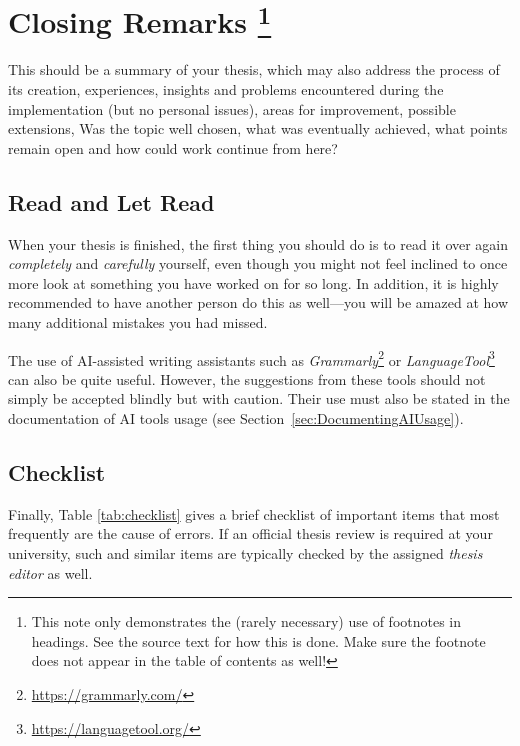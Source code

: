 \chapter[Closing Remarks]{Closing Remarks%
\protect\footnote{This note only demonstrates the (rarely necessary)
use of footnotes in headings. See the source text for how this is done.
Make sure the footnote does not appear in the table of contents as well!}}%
\label{cha:Closing}

This should be a summary of your thesis, which may also address the
process of its creation, experiences, insights and problems encountered during
the implementation (but no personal issues), areas for improvement, possible
extensions, \etc
Was the topic well chosen, what was eventually achieved,
what points remain open and how could work continue from here?


\section{Read and Let Read}

When your thesis is finished, the first thing you should do is to read it
over again \emph{completely} and \emph{carefully} yourself, even though you
might not feel inclined to once more look at something you have worked on for
so long. In addition, it is highly recommended to have another person do this
as well---you will be amazed at how many additional mistakes you had missed.

The use of AI-assisted writing assistants such as
\emph{Grammarly}\footnote{\url{https://grammarly.com/}} or
\emph{LanguageTool}\footnote{\url{https://languagetool.org/}}
can also be quite useful. However, the suggestions from these tools should not
simply be accepted blindly but with caution. Their use must also be stated in
the documentation of AI tools usage (see Section~\ref{sec:DocumentingAIUsage}).


\section{Checklist}

Finally, Table \ref{tab:checklist} gives a brief checklist of important items
that most frequently are the cause of errors. If an official thesis review is 
required at your university, such and similar items are typically checked 
by the assigned \emph{thesis editor} as well.


